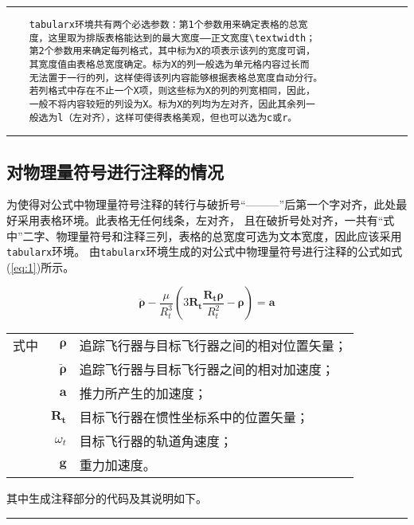 \noindent\hrule
\begin{verbatim}
	tabularx环境共有两个必选参数：第1个参数用来确定表格的总宽
	度，这里取为排版表格能达到的最大宽度——正文宽度\textwidth；
	第2个参数用来确定每列格式，其中标为X的项表示该列的宽度可调，
	其宽度值由表格总宽度确定。标为X的列一般选为单元格内容过长而
	无法置于一行的列，这样使得该列内容能够根据表格总宽度自动分行。
	若列格式中存在不止一个X项，则这些标为X的列的列宽相同，因此，
	一般不将内容较短的列设为X。标为X的列均为左对齐，因此其余列一
	般选为l（左对齐），这样可使得表格美观，但也可以选为c或r。
\end{verbatim}

\noindent\hrule
\subsection{对物理量符号进行注释的情况}
为使得对公式中物理量符号注释的转行与破折号“———”后第一个字对齐，此处最好采用表格环境。此表格无任何线条，左对齐，
且在破折号处对齐，一共有“式中”二字、物理量符号和注释三列，表格的总宽度可选为文本宽度，因此应该采用\verb|tabularx|环境。
由\verb|tabularx|环境生成的对公式中物理量符号进行注释的公式如式(\ref{eq:1})所示。

\begin{equation}\label{eq:1}
	\ddot{\boldsymbol{\rho}}-\frac{\mu}{R_{t}^{3}}\left(3\mathbf{R_{t}}\frac{\mathbf{R_{t}\rho}}{R_{t}^{2}}-\boldsymbol{\rho}\right)=\mathbf{a}
\end{equation}

\begin{tabularx}{\textwidth}{@{}l@{\quad}r@{———}X@{}}
	式中 & $\bm{\rho}$        & 追踪飞行器与目标飞行器之间的相对位置矢量； \\
	     & $\bm{\ddot{\rho}}$ & 追踪飞行器与目标飞行器之间的相对加速度；   \\
	     & $\mathbf{a}$       & 推力所产生的加速度；                       \\
	     & $\mathbf{R_t}$     & 目标飞行器在惯性坐标系中的位置矢量；       \\
	     & $\omega_{t}$       & 目标飞行器的轨道角速度；                   \\
	     & $\mathbf{g}$       & 重力加速度。
\end{tabularx}
\vspace{\wordsep}

其中生成注释部分的代码及其说明如下。

\vspace{1em}\noindent\hrule

